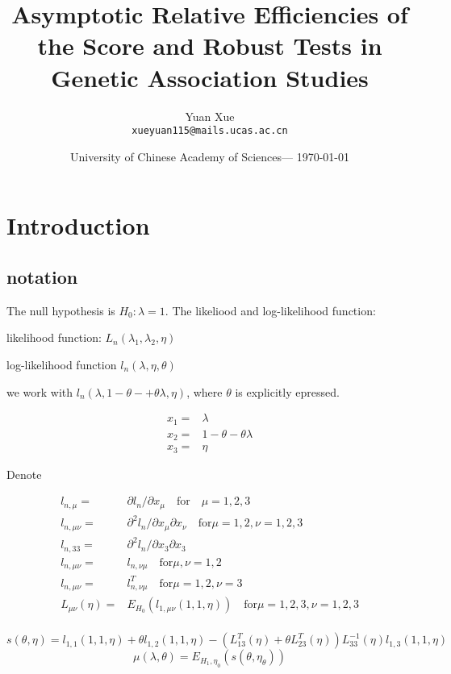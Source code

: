 \documentclass{article}
\title{Asymptotic Relative Efficiencies of the Score and Robust Tests in Genetic Association Studies} %
\author{Yuan Xue\\ \texttt{xueyuan115@mails.ucas.ac.cn}} %
\date{University of Chinese Academy of Sciences--- \today} %
\begin{document}
\maketitle %


\section{Introduction} %
\subsection{notation} 

The null hypothesis is $H_0: \lambda=1$. The likeliood and log-likelihood function:
 
likelihood function: $L_n(\lambda_1,\lambda_2,\eta)$

log-likelihood function $l_n(\lambda,\eta,\theta)$

we work with $l_n(\lambda,1-\theta-+\theta\lambda,\eta)$, where $\theta$  is explicitly epressed.

\begin{align*}
x_1 = & \lambda\\
x_2= & 1-\theta-\theta\lambda\\
x_3 = & \eta
\end{align*}

Denote 

\begin{align*}
  l_{n,\mu} =& \partial l_n/\partial x_\mu \quad \text{for} \quad \mu= 1,2,3 \\
  l_{n,\mu\nu}= & \partial^2 l_n/\partial x_\mu \partial x_\nu \quad \text{for} \mu=1,2, \nu= 1,2,3\\
  l_{n,33}= & \partial^2 l_n/\partial x_3 \partial x_3\\
  l_{n,\mu\nu} = & l_{n,\nu\mu} \quad \text{for} \mu,\nu = 1,2\\
  l_{n,\mu\nu} = & l^T_{n,\nu\mu} \quad \text{for} \mu= 1,2, \nu=3\\
  L_{\mu\nu}(\eta) =& E_{H_0}(l_{1,\mu\nu}(1,1,\eta))\quad \text{for} \mu=1,2,3, \nu= 1,2,3\\
\end{align*}

$$s(\theta,\eta) = l_{1,1}(1,1,\eta)+\theta l_{1,2}(1,1,\eta)-(L_{13}^T(\eta)+\theta L_{23}^T(\eta))L_{33}^{-1}(\eta)l_{1,3}(1,1,\eta)$$
$$\mu(\lambda,\theta)=E_{H_1,\eta_0}(s(\theta,\eta_\theta))$$
\end{document}
